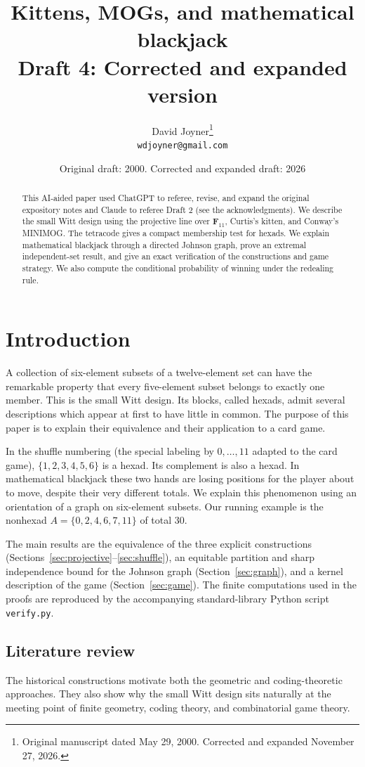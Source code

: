 \documentclass[12pt,letterpaper]{article}
\title{Kittens, MOGs, and mathematical blackjack\\\large Draft 4: Corrected and expanded version}
\author{David Joyner\thanks{Original manuscript dated May 29, 2000. Corrected and expanded November 27, 2026.}\\\small\texttt{wdjoyner@gmail.com}}
\date{Original draft: 2000. Corrected and expanded draft: 2026}
\theoremstyle{definition}\newtheorem{example}[theorem]{Example}
\numberwithin{equation}{section}
\newcommand{\F}{\mathbf F}
\begin{document}
\maketitle

\begin{abstract}
This AI-aided paper used ChatGPT to referee, revise, and expand the original expository notes and Claude to referee Draft 2 (see the acknowledgments). We describe the small Witt design using the projective line over $\F_{11}$, Curtis's kitten, and Conway's MINIMOG. The tetracode gives a compact membership test for hexads. We explain mathematical blackjack through a directed Johnson graph, prove an extremal independent-set result, and give an exact verification of the constructions and game strategy. We also compute the conditional probability of winning under the redealing rule.
\end{abstract}

\tableofcontents

\section{Introduction}
A collection of six-element subsets of a twelve-element set can have the remarkable property that every five-element subset belongs to exactly one member. This is the small Witt design. Its blocks, called hexads, admit several descriptions which appear at first to have little in common. The purpose of this paper is to explain their equivalence and their application to a card game.

In the shuffle numbering (the special labeling by $0,\ldots,11$ adapted to the card game), $\{1,2,3,4,5,6\}$ is a hexad. Its complement is also a hexad. In mathematical blackjack these two hands are losing positions for the player about to move, despite their very different totals. We explain this phenomenon using an orientation of a graph on six-element subsets. Our running example is the nonhexad $A=\{0,2,4,6,7,11\}$ of total 30.

The main results are the equivalence of the three explicit constructions (Sections~\ref{sec:projective}--\ref{sec:shuffle}), an equitable partition and sharp independence bound for the Johnson graph (Section~\ref{sec:graph}), and a kernel description of the game (Section~\ref{sec:game}). The finite computations used in the proofs are reproduced by the accompanying standard-library Python script \texttt{verify.py}.

\subsection{Literature review}
The historical constructions motivate both the geometric and coding-theoretic approaches. They also show why the small Witt design sits naturally at the meeting point of finite geometry, coding theory, and combinatorial game theory.
\end{document}
